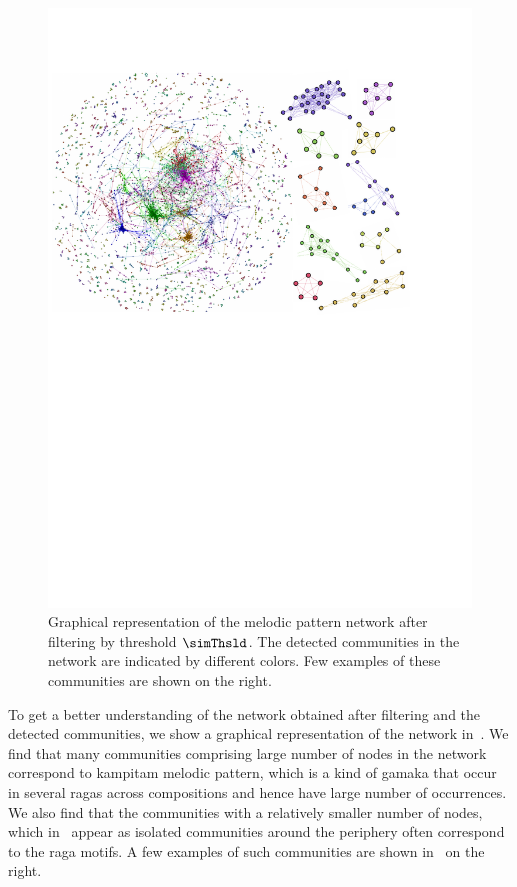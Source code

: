 {\begin{figure}
	\begin{center}
		\includegraphics[width=\figSizeHundred]{ch06_patterns/figures/Characterization/networkWithClusters.pdf}
	\end{center}
 \caption[Graphical representation of a network of melodic patterns]{Graphical representation of the melodic pattern network after filtering by threshold $\simThsld$. The detected communities in the network are indicated by different colors. Few examples of these communities are shown on the right.}
 \label{fig:network_and_communities_pattern_characterization}
\end{figure}

To get a better understanding of the network obtained after filtering and the detected communities, we show a graphical representation of the network in~. We find that many communities comprising large number of nodes in the network correspond to \gls{kampitam} melodic pattern, which is a kind of \gls{gamaka} that occur in several \glspl{raga} across compositions and hence have large number of occurrences. We also find that the communities with a relatively smaller number of nodes, which in~ appear as isolated communities around the periphery often correspond to the \gls{raga} motifs. A few examples of such communities are shown in~ on the right.

}

